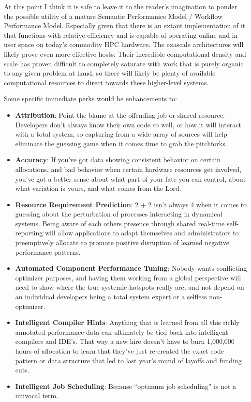 At this point I think it is safe to leave it to the reader's
imagination to ponder the possible utility of a mature Semantic
Performanice Model / Workflow Performance Model. Especially given that
there is an extant implementation of it that functions with relative
efficiency and is capable of operating online and in user space on
today's commodity HPC hardware. The exascale architectures will likely
prove even more effective hosts: Their incredible computational
density and scale has proven difficult to completely saturate with
work that is purely organic to any given problem at hand, so there
will likely be plenty of available computational resources to direct
towards these higher-level systems.

Some specific immediate perks would be enhancements to:
\begin{itemize}
\item \textbf{Attribution}: Point the blame at the offending job or shared
  resource. Developers don't always know their own code so well,
  or how it will interact with a total system, so capturing from a
  wide array of sources will help eliminate the guessing game when it
  comes time to grab the pitchforks.
\item \textbf{Accuracy}: If you've got data showing consistent behavior on
      certain allocations, and bad behavior when certain hardware resources
      get involved, you've got a better sense about what part of your
      fate you can control, about what variation is yours, and what comes
      from the Lord.
\item \textbf{Resource Requirement Prediction}: 2 + 2 isn't always 4 when it
      comes to guessing about the perturbation of processes interacting in
      dynamical systems. Being aware of each others presence through shared
      real-time self-reporting will allow applications to adapt themselves
      and administrators to preemptively allocate to promote positive
      disruption of learned negative performance patterns.
\item \textbf{Automated Component Performance Tuning}: Nobody wants conflicting
  optimizer purposes, and having them working from a global perspective will
  need to show where the true systemic hotspots really are, and not depend on
  an individual developers being a total system expert or a selfless non-optimizer.
\item \textbf{Intelligent Compiler Hints}: Anything that is learned from all
      this richly annotated performance data can ultimately be tied back
      into intelligent compilers and IDE's. That way a new hire doesn't have
      to burn 1,000,000 hours of allocation to learn that they've just
      re-created the exact code pattern or data structure that led to last
      year's round of layoffs and funding cuts.
\item \textbf{Intelligent Job Scheduling}: Because ``optimum job scheduling''
      is not a univocal term.
\end{itemize}

